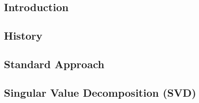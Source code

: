 

\subsection{Introduction}


\clearpage




\subsection{History}

\clearpage




\subsection{Standard Approach}

\clearpage




\subsection{Singular Value Decomposition (SVD)}

\clearpage
